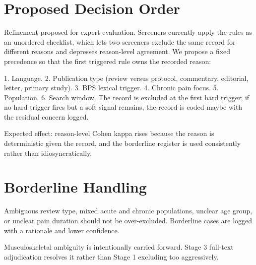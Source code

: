\documentclass[11pt]{article}
\begin{document}
\section*{Proposed Decision Order}
Refinement proposed for expert evaluation. Screeners currently apply the rules as an unordered checklist, which lets two screeners exclude the same record for different reasons and depresses reason-level agreement. We propose a fixed precedence so that the first triggered rule owns the recorded reason:

1. Language. 2. Publication type (review versus protocol, commentary, editorial, letter, primary study). 3. BPS lexical trigger. 4. Chronic pain focus. 5. Population. 6. Search window. The record is excluded at the first hard trigger; if no hard trigger fires but a soft signal remains, the record is coded maybe with the residual concern logged.

Expected effect: reason-level Cohen kappa rises because the reason is deterministic given the record, and the borderline register is used consistently rather than idiosyncratically.


\section*{Borderline Handling}
Ambiguous review type, mixed acute and chronic populations, unclear age group, or unclear pain duration should not be over-excluded. Borderline cases are logged with a rationale and lower confidence.

Musculoskeletal ambiguity is intentionally carried forward. Stage 3 full-text adjudication resolves it rather than Stage 1 excluding too aggressively.
\end{document}
